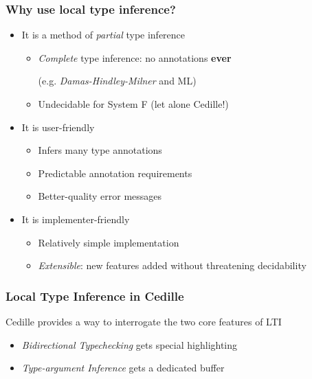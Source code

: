 \documentclass{beamer}
\begin{document}
\begin{frame}
  \frametitle{Why use local type inference?}
  \begin{itemize}
  \item It is a method of \textit{partial} type inference
    \begin{itemize}
    \item \textit{Complete} type inference: no annotations \textbf{ever}

      (e.g. \textit{Damas-Hindley-Milner} and ML)
    \item Undecidable for System F (let alone Cedille!)
    \end{itemize}
    \pause
  \item It is user-friendly
    \begin{itemize}
    \item Infers many type annotations
    \item Predictable annotation requirements
    \item Better-quality error messages
    \end{itemize}
    \pause
  \item It is implementer-friendly
    \begin{itemize}
    \item Relatively simple implementation
    \item \textit{Extensible}: new features added without threatening decidability
    \end{itemize}
  \end{itemize}
\end{frame}

\begin{frame}
  \frametitle{Local Type Inference in Cedille}
  Cedille provides a way to interrogate the two core features of LTI
  
  \begin{itemize}
  \item \textit{Bidirectional Typechecking} gets special highlighting
  \item \textit{Type-argument Inference} gets a dedicated buffer

  \end{itemize}

  \ \\ \ \\
\end{frame}
\end{document}
